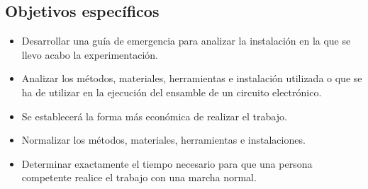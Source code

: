     
    \subsection{Objetivos específicos }
    \begin{itemize}
        \item Desarrollar una guía de emergencia para analizar la instalación en la que se llevo acabo la experimentación.
        \item Analizar los métodos, materiales, herramientas e instalación utilizada o que se ha de utilizar en la ejecución del ensamble de un circuito electrónico.
        \item Se establecerá la forma más económica de realizar el trabajo.
        \item Normalizar los métodos, materiales, herramientas e instalaciones.
        \item Determinar exactamente el tiempo necesario para que una persona competente realice el trabajo con una marcha normal.
    \end{itemize}
    
